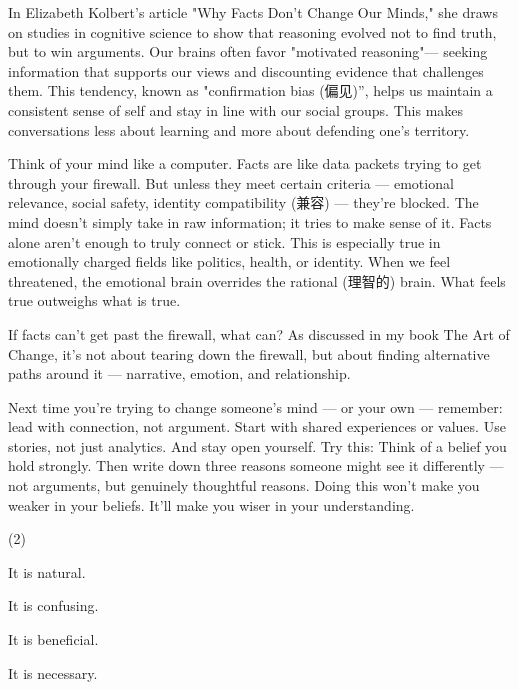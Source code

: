 \documentclass{英语试卷}
\begin{document}
\par In Elizabeth Kolbert's article "Why Facts Don’t Change Our Minds," she draws on studies in cognitive science to show that reasoning evolved not to find truth, but to win arguments. Our brains often favor "motivated reasoning"— seeking information that supports our views and discounting evidence that challenges them. This tendency, known as "confirmation bias (偏见)”, helps us maintain a consistent sense of self and stay in line with our social groups. This makes conversations less about learning and more about defending one’s territory.\par
\par Think of your mind like a computer. Facts are like data packets trying to get through your firewall. But unless they meet certain criteria — emotional relevance, social safety, identity compatibility (兼容) — they're blocked. The mind doesn't simply take in raw information; it tries to make sense of it. Facts alone aren't enough to truly connect or stick. This is especially true in emotionally charged fields like politics, health, or identity. When we feel threatened, the emotional brain overrides the rational (理智的) brain. What feels true outweighs what is true.\par
\par If facts can't get past the firewall, what can? As discussed in my book The Art of Change, it's not about tearing down the firewall, but about finding alternative paths around it — narrative, emotion, and relationship.\par
\par Next time you're trying to change someone's mind — or your own — remember: lead with connection, not argument. Start with shared experiences or values. Use stories, not just analytics. And stay open yourself. Try this: Think of a belief you hold strongly. Then write down three reasons someone might see it differently — not arguments, but genuinely thoughtful reasons. Doing this won't make you weaker in your beliefs. It'll make you wiser in your understanding.\par
{}
\begin{choices}(2)
  \item It is natural.
  \item It is confusing.
  \item It is beneficial.
  \item It is necessary.
\end{choices}
\end{document}
